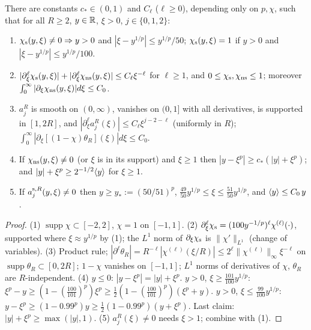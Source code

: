 \begin{lemma}
  \label{lem:c09_cutoff_bounds}
  There are constants $c_*\in(0,1)$ and $C_\ell$ ($\ell\ge0$), depending only on $p,\chi$, such that for all $R\ge2$, $y\in\mathbb{R}$, $\xi>0$, $j\in\{0,1,2\}$:
  \begin{enumerate}
    \item $\chi_{\textup{s}}(y,\xi)\neq0\Rightarrow y>0$ and $|\xi-y^{1/p}|\le y^{1/p}/50$; $\chi_{\textup{s}}(y,\xi)=1$ if $y>0$ and $|\xi-y^{1/p}|\le y^{1/p}/100$.
    \item $|\partial_\xi^\ell\chi_{\textup{s}}(y,\xi)|+|\partial_\xi^\ell\chi_{\textup{ns}}(y,\xi)|\le C_\ell\xi^{-\ell}$ for $\ell\ge1$, and $0\le\chi_{\textup{s}},\chi_{\textup{ns}}\le1$;
      moreover $\int_0^\infty|\partial_\xi\chi_{\textup{ns}}(y,\xi)|d\xi\le C_0$.
    \item $a_j^R$ is smooth on $(0,\infty)$, vanishes on $(0,1]$ with all derivatives, is supported in $[1,2R]$, and $|\partial_\xi^\ell a_j^R(\xi)|\le C_\ell\xi^{j-2-\ell}$
      (uniformly in $R$); $\int_0^\infty|\partial_\xi[(1-\chi)\theta_R](\xi)|d\xi\le C_0$.
    \item If $\chi_{\textup{ns}}(y,\xi)\neq0$ (or $\xi$ is in its support) and $\xi\ge1$ then $|y-\xi^p|\ge c_*(|y|+\xi^p)$; and $|y|+\xi^p\ge2^{-1/2}\langle y \rangle$ for $\xi\ge1$.
    \item If $a_j^{\textup{s},R}(y,\xi)\neq0$ then $y\ge y_*:=(50/51)^p$, $\frac{49}{50}y^{1/p}\le\xi\le\frac{51}{50}y^{1/p}$, and $\langle y \rangle\le C_0\,y$.
  \end{enumerate}
\end{lemma}
\begin{proof}
  (1) $\operatorname{supp}\chi\subset[-2,2]$, $\chi=1$ on $[-1,1]$. (2) $\partial_\xi^\ell\chi_{\textup{s}}=(100y^{-1/p})^\ell\chi^{(\ell)}(\cdot)$, supported where
  $\xi\approx y^{1/p}$ by (1); the $L^1$ norm of $\partial_\xi\chi_{\textup{s}}$ is $\|\chi'\|_{L^1}$ (change of variables).
  (3) Product rule; $|\partial^\ell\theta_R|=R^{-\ell}|\chi^{(\ell)}(\xi/R)|\le 2^\ell\|\chi^{(\ell)}\|_\infty\xi^{-\ell}$ on $\operatorname{supp}\theta_R\subset[0,2R]$; $1-\chi$ vanishes
  on $[-1,1]$; $L^1$ norms of derivatives of $\chi$, $\theta_R$ are $R$-independent.
  (4) $y\le0$: $|y-\xi^p|=|y|+\xi^p$. $y>0$, $\xi\ge\frac{101}{100}y^{1/p}$: $\xi^p-y\ge(1-(\frac{100}{101})^p)\xi^p\ge\frac12(1-(\frac{100}{101})^p)(\xi^p+y)$.
  $y>0$, $\xi\le\frac{99}{100}y^{1/p}$: $y-\xi^p\ge(1-0.99^p)y\ge\frac12(1-0.99^p)(y+\xi^p)$. Last claim: $|y|+\xi^p\ge\max(|y|,1)$.
  (5) $a_j^R(\xi)\neq0$ needs $\xi>1$; combine with (1).
\end{proof}

